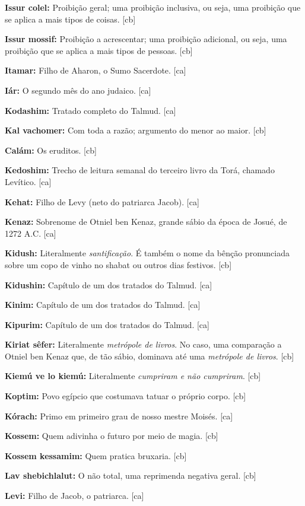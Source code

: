 \textbf{Issur colel:} Proibição geral; uma proibição inclusiva, ou seja, uma proibição que se aplica a mais tipos de coisas. [cb]

\textbf{Issur mossif:} Proibição a acrescentar; uma proibição adicional, ou seja, uma proibição que se aplica a mais tipos de pessoas. [cb]

\textbf{Itamar:} Filho de Aharon, o Sumo Sacerdote. [ca]

\textbf{Iár:} O segundo mês do ano judaico. [ca]

\textbf{Kodashim:} Tratado completo do Talmud. [ca]

\textbf{Kal vachomer:} Com toda a razão; argumento do menor ao maior. [cb]

\textbf{Calám:} Os eruditos. [cb]

\textbf{Kedoshim:} Trecho de leitura semanal do terceiro livro
da Torá, chamado Levítico. [ca]

\textbf{Kehat:} Filho de Levy (neto do patriarca Jacob). [ca]

\textbf{Kenaz:} Sobrenome de Otniel ben Kenaz, grande sábio da época de Josué, de
1272 A.C. [ca]

\textbf{Kidush:} Literalmente \emph{santificação}. É também o nome da bênção 
pronunciada sobre um copo de vinho no shabat ou outros dias festivos. [cb]

\textbf{Kidushin:} Capítulo de um dos tratados do Talmud. [ca]

\textbf{Kinim:} Capítulo de um dos tratados do Talmud. [ca]

\textbf{Kipurim:} Capítulo de um dos tratados do Talmud. [ca]

\textbf{Kiriat sêfer:} Literalmente \emph{metrópole de livros}. No caso, 
uma comparação a Otniel ben Kenaz que, de tão sábio, dominava até 
uma \emph{metrópole de livros}. [cb]

\textbf{Kiemú ve lo kiemú:} Literalmente \emph{cumpriram e não cumpriram}. [cb]

\textbf{Koptim:} Povo egípcio que costumava tatuar o próprio corpo. [cb]

\textbf{Kórach:} Primo em primeiro grau de nosso mestre Moisés. [ca]

\textbf{Kossem:} Quem adivinha o futuro por meio de magia. [cb]

\textbf{Kossem kessamim:} Quem pratica bruxaria. [cb]

\textbf{Lav shebichlalut:} O não total, uma reprimenda negativa geral. [cb]

\textbf{Levi:} Filho de Jacob, o patriarca. [ca]

